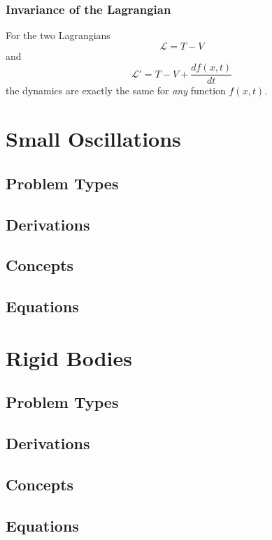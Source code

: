 \documentclass[25pt]{book}
\begin{document}
	\subsection{Invariance of the Lagrangian}
	
	For the two Lagrangians 
	\[
	\mathcal{L} = T - V
	\]
	and 
	\[
	\mathcal{L}' = T - V + \frac{d f(x,t)}{dt}
	\]
	the dynamics are exactly the same for \textit{any} function $f(x,t)$. 
	
	
	
	
	
	\chapter{Small Oscillations}
	
	\section{Problem Types}
	
	\section{Derivations}
	
	\section{Concepts}
	
	\section{Equations}
	
	\chapter{Rigid Bodies}
	
	\section{Problem Types}
	
	\section{Derivations}
	
	\section{Concepts}
	
	\section{Equations}
	
\end{document}

